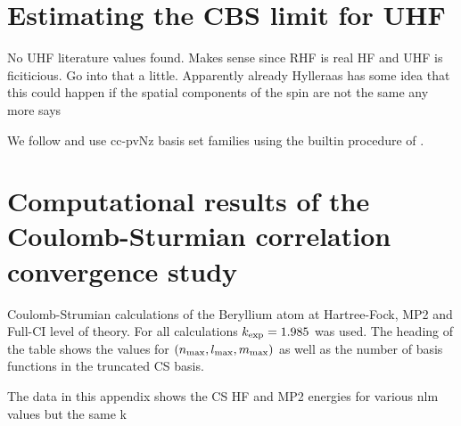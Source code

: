 \begin{appendix}
\chapter{Estimating the CBS limit for UHF}
\label{apx:CbsLimit}
No UHF literature values found.
Makes sense since RHF is real HF and UHF is ficiticious.
Go into that a little.
Apparently already Hylleraas\cite{Hylleraas1929} has some idea that this could
happen if the spatial components of the spin are not the same any more
says \cite{Mestechkin1981}


We follow \cite{Jensen2005} and use cc-pvNz basis set families
using the builtin procedure of \molsturm.


\chapter{Computational results of the Coulomb-Sturmian correlation convergence study}
\label{apx:CSCorrelationConvergence}


\begin{table}
	\centering
	
	\caption{Coulomb-Strumian calculations of the Beryllium atom
		at Hartree-Fock, MP2 and Full-CI level of theory.
		For all calculations $k_\text{exp} = 1.985$ was used.
		The heading of the table shows the values for
		$(n_\text{max}, l_\text{max}, m_\text{max})$ as well as the
		number of basis functions
		in the truncated CS basis.}
	\label{tab:CStruncationEnergies}
\end{table}


The data in this appendix shows the CS HF and MP2 energies
for various nlm values but the same k



















\end{appendix}
